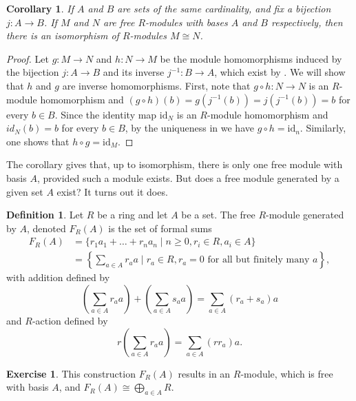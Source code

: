 \documentclass[12pt]{report}
\newtheorem{corollary}[theorem]{Corollary}
\numberwithin{equation}{section}
\numberwithin{theorem}{chapter}
\theoremstyle{definition}
\newtheorem{definition}[theorem]{Definition}
\newtheorem{exercise}{Exercise}
\newtheorem*{basic properties}{Basic Properties}
\newtheorem*{Important Remark}{Important Remark}
\begin{document}
\begin{corollary}\label{bijective bases implies iso}
If $A$ and $B$ are sets of the same cardinality, and fix a bijection $j:A\to B$. If $M$ and $N$ are free $R$-modules with bases $A$ and $B$ respectively, then there is an isomorphism of $R$-modules $M \cong N$.
\end{corollary}



\begin{proof}
Let $g:M\to N$ and $h:N\to M$ be the module homomorphisms induced by the bijection $j:A\to B$ and its inverse $j^{-1}:B\to A$, which exist by . We will show that $h$ and $g$ are inverse homomorphisms. 
First, note that $g \circ h:N\to N$ is an $R$-module homomorphism and $(g \circ h)(b) = g(j^{-1}(b))=j(j^{-1}(b))=b$ for every $b\in B$. Since the identity map $\mathrm{id}_N$ is an $R$-module homomorphism and $id_N(b)=b$ for every $b\in B$, by the uniqueness in  we have $g \circ h = \mathrm{id}_n$. Similarly, one shows that $h \circ g = \mathrm{id}_M$.
\end{proof}



The corollary gives that, up to isomorphism, there is only one free module with basis $A$, provided such a module exists. But does a free module generated by a given set $A$ exist? It turns out it does.  

\begin{definition}
Let $R$ be a ring and let $A$ be a set. The free $R$-module generated by $A$, denoted $F_R(A)$ is the set of formal sums 
\begin{align*}
F_R(A) &= \{r_1a_1 + \dots + r_na_n \mid n \geqslant 0, r_i \in R, a_i \in A\} \\
&= \left\lbrace \sum_{a \in A} r_aa \mid r_a \in R, r_a = 0 \text{ for all but finitely many }a \right\rbrace,
\end{align*} with addition defined by 
$$\left(\sum_{a \in A} r_aa\right) + \left(\sum_{a \in A} s_aa \right) = \sum_{a \in A} (r_a + s_a)a$$ and $R$-action defined by 
$$r \left(\sum_{a \in A} r_aa \right) = \sum_{a \in A} (rr_a)a.$$  
\end{definition}

\begin{exercise}
This construction $F_R(A)$ results in an $R$-module, which is free with basis $A$, and $F_R(A)\cong \bigoplus_{a\in A}R$.
\end{exercise}
\end{document}
